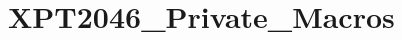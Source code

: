 \hypertarget{group___x_p_t2046___private___macros}{}\section{X\+P\+T2046\+\_\+\+Private\+\_\+\+Macros}
\label{group___x_p_t2046___private___macros}
